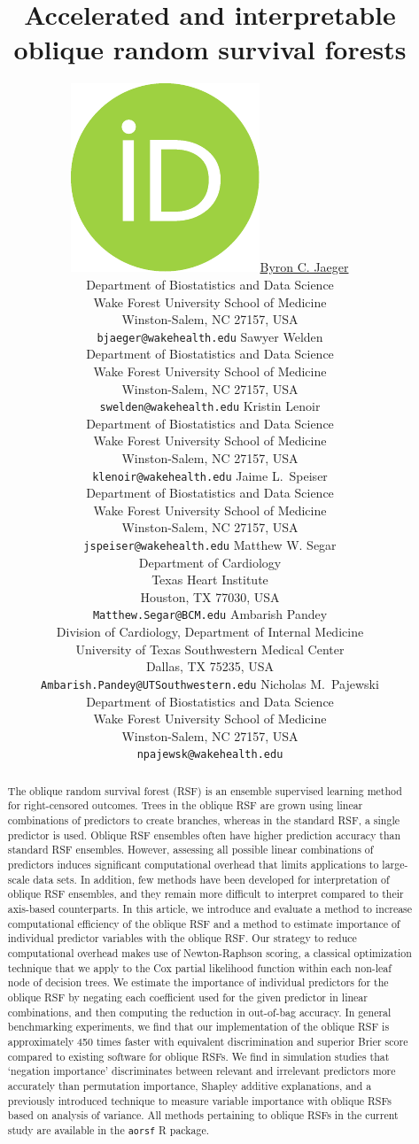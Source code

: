 \documentclass{article}\usepackage[]{graphicx}\usepackage[]{xcolor}
\title{Accelerated and interpretable oblique random survival forests}
\author{ \href{https://orcid.org/0000-0001-7399-2299}{\includegraphics[scale=0.06]{orcid.pdf}\hspace{1mm}Byron C. Jaeger} \\
	Department of Biostatistics and Data Science\\
	Wake Forest University School of Medicine\\
	Winston-Salem, NC 27157, USA \\
	\texttt{bjaeger@wakehealth.edu}
	\AND
   Sawyer Welden \\
   Department of Biostatistics and Data Science\\
   Wake Forest University School of Medicine\\
   Winston-Salem, NC 27157, USA \\
   \texttt{swelden@wakehealth.edu}
   \And
   Kristin Lenoir \\
   Department of Biostatistics and Data Science\\
   Wake Forest University School of Medicine\\
   Winston-Salem, NC 27157, USA \\
   \texttt{klenoir@wakehealth.edu}
	 \And
	 Jaime L.~Speiser \\
	 Department of Biostatistics and Data Science\\
	 Wake Forest University School of Medicine\\
	 Winston-Salem, NC 27157, USA \\
	 \texttt{jspeiser@wakehealth.edu}
	 \And
	 Matthew W. Segar \\
   Department of Cardiology \\
   Texas Heart Institute \\
   Houston, TX 77030, USA \\
	 \texttt{Matthew.Segar@BCM.edu}
   \And
	 Ambarish Pandey \\
   Division of Cardiology, Department of Internal Medicine \\
   University of Texas Southwestern Medical Center \\
   Dallas, TX 75235, USA \\
	 \texttt{Ambarish.Pandey@UTSouthwestern.edu}
	 \And
	 Nicholas M.~Pajewski \\
	 Department of Biostatistics and Data Science\\
	 Wake Forest University School of Medicine\\
	 Winston-Salem, NC 27157, USA \\
	 \texttt{npajewsk@wakehealth.edu}
}
\begin{document}
\maketitle




\begin{abstract}

	The oblique random survival forest (RSF) is an ensemble supervised learning method for right-censored outcomes. Trees in the oblique RSF are grown using linear combinations of predictors to create branches, whereas in the standard RSF, a single predictor is used. Oblique RSF ensembles often have higher prediction accuracy than standard RSF ensembles. However, assessing all possible linear combinations of predictors induces significant computational overhead that limits applications to large-scale data sets. In addition, few methods have been developed for interpretation of oblique RSF ensembles, and they remain more difficult to interpret compared to their axis-based counterparts. In this article, we introduce and evaluate a method to increase computational efficiency of the oblique RSF and a method to estimate importance of individual predictor variables with the oblique RSF. Our strategy to reduce computational overhead makes use of Newton-Raphson scoring, a classical optimization technique that we apply to the Cox partial likelihood function within each non-leaf node of decision trees. We estimate the importance of individual predictors for the oblique RSF by negating each coefficient used for the given predictor in linear combinations, and then computing the reduction in out-of-bag accuracy. In general benchmarking experiments, we find that our implementation of the oblique RSF is approximately 450 times faster with equivalent discrimination and superior Brier score compared to existing software for oblique RSFs. We find in simulation studies that `negation importance' discriminates between relevant and irrelevant predictors more accurately than permutation importance, Shapley additive explanations, and a previously introduced technique to measure variable importance with oblique RSFs based on analysis of variance. All methods pertaining to oblique RSFs in the current study are available in the \texttt{aorsf} R package.

\end{abstract}


\end{document}
